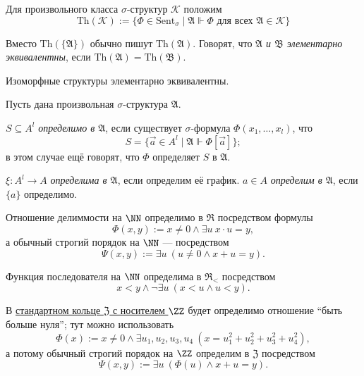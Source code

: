 \documentclass[12pt,a4paper]{article}
\newcommand{\Sent}{\ensuremath{\mathrm{Sent}}\xspace}
\newcommand{\Th}{\ensuremath{\mathrm{Th}}\xspace}
\begin{document}
    \begin{definition}
        Для произвольного класса $\sigma$-структур $\mathcal{K}$ положим
        \[\Th(\mathcal{K}) := \{\Phi \in \Sent_\sigma \mid \mathfrak{A} \Vdash \Phi \text{ для всех } \mathfrak{A} \in \mathcal{K}\}\]

        Вместо $\Th(\{\mathfrak{A}\})$ обычно пишут \emph{$\Th(\mathfrak{A})$}. Говорят, что \emph{$\mathfrak{A}$ и $\mathfrak{B}$ элементарно эквивалентны}, если $\Th(\mathfrak{A}) = \Th(\mathfrak{B})$.
    \end{definition}

    \begin{lemma}
        Изоморфные структуры элементарно эквивалентны.
    \end{lemma}

    \begin{definition}
        Пусть дана произвольная $\sigma$-структура $\mathfrak{A}$.

        $S \subseteq A^l$ \emph{определимо в $\mathfrak{A}$}, если существует $\sigma$-формула $\Phi(x_1, \dots, x_l)$, что
        \[S = \{\overrightarrow{a} \in A^l \mid \mathfrak{A} \Vdash \Phi[\overrightarrow{a}]\};\]
        в этом случае ещё говорят, что $\Phi$ определяет $S$ в $\mathfrak{A}$.

        $\xi: A^l \to A$ \emph{определима в $\mathfrak{A}$}, если определим её график. $a \in A$ \emph{определим в $\mathfrak{A}$}, если $\{a\}$ определимо.
    \end{definition}

    \begin{example}
        Отношение делиммости на $\NN$ определимо в \hyperlink{R-structure-definition}{$\mathfrak{R}$} посредством формулы
        \[\Phi(x, y) := x \neq 0 \wedge \exists u\ x \cdot u = y,\]
        а обычный строгий порядок на $\NN$ --- посредством
        \[\Psi(x, y) := \exists u\ (u \neq 0 \wedge x + u = y).\]
    \end{example}

    \begin{example}
        Функция последователя на $\NN$ определима в \hyperlink{R_le-structure-definition}{$\mathfrak{R}_{<}$} посредством
        \[x < y \wedge \neg \exists u\ (x < u \wedge u < y).\]
    \end{example}

    \begin{example}
        В \hyperlink{Z-structure-definition}{стандартном кольце $\mathfrak{Z}$ с носителем $\ZZ$} будет определимо отношение ``быть больше нуля''; тут можно использовать
        \[\Phi(x) := x \neq 0 \wedge \exists u_1, u_2, u_3, u_4\ (x = u_1^2 + u_2^2 + u_3^2 + u_4^2),\]
        а потому обычный строгий порядок на $\ZZ$ определим в $\mathfrak{Z}$ посредством
        \[\Psi(x, y) := \exists u\ (\Phi(u) \wedge x + u = y).\]
    \end{example}
\end{document}
